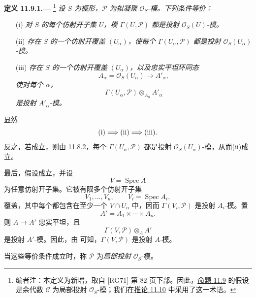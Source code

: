 \medskip
{}\label{def:sga3-VIB-11.9.1}%
\noindent\textbf{定义 11.9.1.---}%
\footnote{\label{note:sga3-VIB-118}编者注：本定义为新增，取自 \textup{[RG71]} 第 82 页下部。因此，\hyperref[prop:sga3-VIB-11.9]{命题 11.9} 的假设是余代数 \(\mathcal C\) 为局部投射 \(\mathcal O_S\)-模；我们在\hyperref[cor:sga3-VIB-11.10]{推论 11.10} 中采用了这一术语。}
\emph{设 \(S\) 为概形，\(\mathcal P\) 为拟凝聚 \(\mathcal O_S\)-模。下列条件等价：}
\begin{enumerate}
\item[\textup{(i)}]\label{concl:sga3-VIB-11.9.1-i}
  \emph{对 \(S\) 的每个仿射开子集 \(U\)，模 \(\Gamma(U,\mathcal P)\) 都是投射 \(\mathcal O_S(U)\)-模。}

\item[\textup{(ii)}]\label{concl:sga3-VIB-11.9.1-ii}
  \emph{存在 \(S\) 的一个仿射开覆盖 \((U_\alpha)\)，使每个 \(\Gamma(U_\alpha,\mathcal P)\) 都是投射 \(\mathcal O_S(U_\alpha)\)-模。}

\item[\textup{\SGAInlineRefTarget{def:sga3-VIB-11.9.1:item:iii}(iii)}]\label{concl:sga3-VIB-11.9.1-iii}
  \emph{存在 \(S\) 的一个仿射开覆盖 \((U_\alpha)\)，以及忠实平坦环同态}
  \[
    A_\alpha=\mathcal O_S(U_\alpha)\longrightarrow A'_\alpha,
  \]
  \emph{使对每个 \(\alpha\)，}
  \[
    \Gamma(U_\alpha,\mathcal P)
      \otimes_{A_\alpha}A'_\alpha
  \]
  \emph{是投射 \(A'_\alpha\)-模。}
\end{enumerate}

显然
\[
  \textup{(i)}\Longrightarrow\textup{(ii)}
  \Longrightarrow\textup{(iii)}.
\]
反之，若\textup{}成立，则由 \hyperref[prop:sga3-VIB-11.8.2]{11.8.2}，每个 \(\Gamma(U_\alpha,\mathcal P)\) 都是投射 \(\mathcal O_S(U_\alpha)\)-模，从而\textup{(ii)}成立。

最后，假设\textup{}成立，并设
\[
  V=\operatorname{Spec}A
\]
为任意仿射开子集。它被有限多个仿射开子集
\[
  V_1,\ldots,V_n,
  \qquad
  V_i=\operatorname{Spec}A_i,
\]
覆盖，其中每个都包含在至少一个 \(V\cap U_\alpha\) 中，因而 \(\Gamma(V_i,\mathcal P)\) 是投射 \(A_i\)-模。置
\[
  A'=A_1\times\cdots\times A_n.
\]
则 \(A\to A'\) 忠实平坦，且
\[
  \Gamma(V,\mathcal P)\otimes_AA'
\]
是投射 \(A'\)-模。因此，由  可知，\(\Gamma(V,\mathcal P)\) 是投射 \(A\)-模。

当这些等价条件成立时，称 \(\mathcal P\) 为\emph{局部投射} \(\mathcal O_S\)-模。

